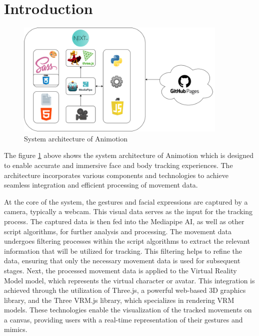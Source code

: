 \section{Introduction}
\begin{figure}[htb]
  \centering
  \includegraphics[width=0.9\textwidth]{pics/systemarchi.png}
  \caption{System architecture of Animotion}
  \label{fig:systemarchi}
\end{figure}

The figure \ref{fig:systemarchi} above shows the system architecture of Animotion which is 
designed to enable accurate and immersive face and body tracking experiences. 
The architecture incorporates various components and technologies to achieve seamless 
integration and efficient processing of movement data.

At the core of the system, the gestures and facial expressions are captured by a camera, typically a webcam. 
This visual data serves as the input for the tracking process. The captured data is then fed into the Mediapipe AI, 
as well as other script algorithms, for further analysis and processing. The movement data undergoes filtering 
processes within the script algorithms to extract the relevant information that will be utilized for tracking. 
This filtering helps to refine the data, ensuring that only the necessary movement data is used for subsequent stages.
Next, the processed movement data is applied to the Virtual Reality Model model, which represents the 
virtual character or avatar. This integration is achieved through the utilization of Three.js, a powerful 
web-based 3D graphics library, and the Three VRM.js library, which specializes in rendering VRM models. 
These technologies enable the visualization of the tracked movements on a canvas, providing users 
with a real-time representation of their gestures and mimics.

